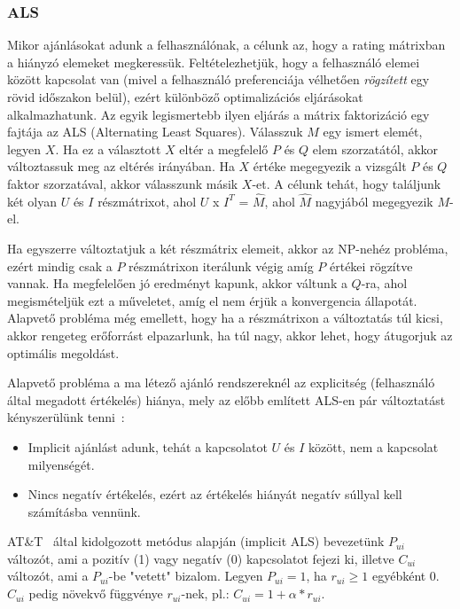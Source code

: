 \documentclass[a4paper,12pt]{article}
\begin{document}
\subsubsection{ALS}
Mikor ajánlásokat adunk a felhasználónak, a célunk az, hogy a rating mátrixban a hiányzó elemeket megkeressük. Feltételezhetjük, hogy a felhasználó elemei között kapcsolat van (mivel a felhasználó preferenciája vélhetően \textsl{rögzített} egy rövid időszakon belül), ezért különböző optimalizációs eljárásokat alkalmazhatunk. Az egyik legismertebb ilyen eljárás a mátrix faktorizáció egy fajtája az ALS (Alternating Least Squares). \newline
Válasszuk $M$ egy ismert elemét, legyen $X$. Ha ez a választott $X$ eltér a megfelelő $P$ és $Q$ elem szorzatától, akkor változtassuk meg az eltérés irányában. Ha $X$ értéke megegyezik a vizsgált $P$ és $Q$ faktor szorzatával, akkor válasszunk másik $X$-et. A célunk tehát, hogy találjunk két olyan $U$ és $I$ részmátrixot, ahol $U$ x $I^T$ = $\hat{M}$, ahol $\hat{M}$ nagyjából megegyezik $M$-el.

Ha egyszerre változtatjuk a két részmátrix elemeit, akkor az NP-nehéz probléma, ezért mindig csak a $P$ részmátrixon iterálunk végig amíg $P$ értékei rögzítve vannak. Ha megfelelően jó eredményt kapunk, akkor váltunk a $Q$-ra, ahol megismételjük ezt a műveletet, amíg el nem érjük a konvergencia állapotát. Alapvető probléma még emellett, hogy ha a részmátrixon a változtatás túl kicsi, akkor rengeteg erőforrást elpazarlunk, ha túl nagy, akkor lehet, hogy átugorjuk az optimális megoldást. \newline

Alapvető probléma a ma létező ajánló rendszereknél az explicitség (felhasználó által megadott értékelés) hiánya, mely az előbb említett ALS-en pár változtatást kényszerülünk tenni~\cite{koren}:
\begin{itemize}
\item Implicit ajánlást adunk, tehát a kapcsolatot $U$ és $I$ között, nem a kapcsolat milyenségét.
\item Nincs negatív értékelés, ezért az értékelés hiányát negatív súllyal kell számításba vennünk.
\end{itemize}

AT\&T~\parencite{koren} által kidolgozott metódus alapján (implicit ALS) bevezetünk $P_{ui}$ változót, ami a pozitív (1) vagy negatív (0) kapcsolatot fejezi ki, illetve $C_{ui}$ változót, ami a $P_{ui}$-be "vetett" bizalom. Legyen $P_{ui} = 1$, ha $r_{ui}\geq1$ egyébként 0. $C_{ui}$ pedig növekvő függvénye $r_{ui}$-nek, pl.: $C_{ui}=1+\alpha*r_{ui}$.
\end{document}

